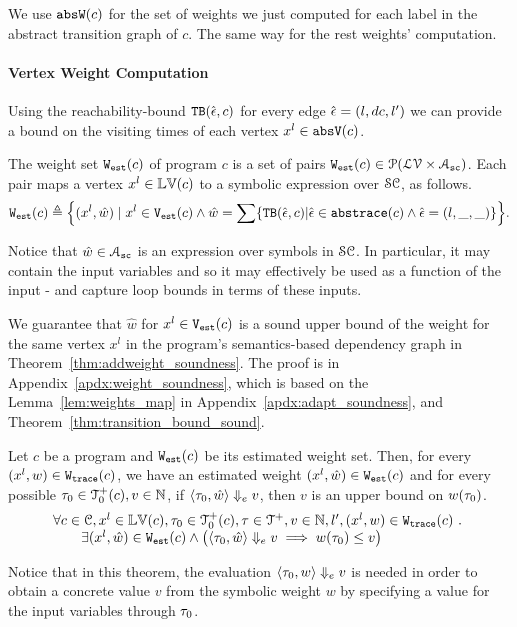 We use $\mathtt{abs}{\mathtt{W}}(c)$ for the set of weights we just computed 
for each label in the abstract transition graph of $c$.
%
The same way for the rest weights' computation.

\paragraph{Vertex Weight Computation}
Using the reachability-bound ${\mathtt{TB}}(\hat{\mathtt{\epsilon}{}}, c)$ for every edge $\hat{\mathtt{\epsilon}{}} = (l, dc, l')$ we can provide a bound on the visiting times of each vertex $x^l \in \mathtt{abs}{\mathtt{V}}(c)$.
\begin{defn}
 \label{def:adaptfun-weight}
The weight set $\mathtt{{W_{est}}}(c)$ of program $c$ is a set of pairs $\mathtt{{W_{est}}}(c) \in \mathcal{P}(\mathcal{LV} \times \mathcal{A}_{\mathtt{sc}})$.
Each pair maps
a vertex $x^l \in \mathbb{LV}(c)$ to a symbolic expression over $\mathcal{SC}$,
as follows.
 \[
 \progW(c) \triangleq
 \left\{ (x^l, \hat{w}) 
\mid
x^l \in \progV(c) 
\land 
\hat{w} = 
\sum\left\{ \absclr(\absevent, c) \middle\vert \absevent \in \absflow(c) \land \absevent = (l, \_, \_) \right\}
\right\}.
\]
\end{defn}
%
Notice that $\hat{w} \in \mathcal{A}_{\mathtt{sc}}$ is an expression over symbols in $\mathcal{SC}$. In particular, it may contain the input variables and so it may effectively be used as a function of the input - and capture loop bounds in terms of these inputs.
 
We guarantee that $\hat{w}$ for $x^l \in \mathtt{{V_{est}}}(c)$ is a sound upper bound of 
the weight for the same vertex $x^l$ in the program's semantics-based dependency graph
in Theorem~\ref{thm:addweight_soundness}.
The proof is in Appendix~\ref{apdx:weight_soundness}, which is based on the Lemma~\ref{lem:weights_map}
in Appendix~\ref{apdx:adapt_soundness}, and Theorem~\ref{thm:transition_bound_sound}.

\begin{thm}
 \label{thm:addweight_soundness}
Let ${c}$ be a program and $\mathtt{{W_{est}}}(c)$ be its estimated weight set.
Then, for every  $(x^l, w) \in \mathtt{{W_{trace}}}(c) $,
we have an estimated weight $(x^l, \hat{w}) \in \mathtt{{W_{est}}}(c)$ and for every possible 
$\mathtt{\tau}_0 \in \mathcal{T}^{+}_0(c),
v \in \mathbb{N}$,
if $\langle \mathtt{\tau}_0, \hat{w} \rangle \Downarrow_e v$,
then $v$ is an upper bound on ${w}(\mathtt{\tau}_0)$.
\[
 \begin{array}{l}
 \forall c \in \mathcal{C}, x^l \in \mathbb{LV}(c),\mathtt{\tau}_0 \in \mathcal{T}^{+}_0(c), \mathtt{\tau} \in \mathcal{T}^{+},
v \in \mathbb{N}, l', (x^l, w) \in \mathtt{{W_{trace}}}(c) ~.~
\\ \qquad 
\exists
(x^l, \hat{w}) \in \mathtt{{W_{est}}}(c) 
\land
\big(
 \langle \mathtt{\tau}_0, \hat{w} \rangle \Downarrow_e v \implies w(\mathtt{\tau}_0) \leq v
\big)
\end{array}
\]
\end{thm}
Notice that in this theorem, the evaluation $\langle \mathtt{\tau}_0, w \rangle \Downarrow_e v$ is needed in order to obtain a concrete value $v$ from the symbolic weight $w$ by specifying a value for the input variables through $\mathtt{\tau}_0$.


